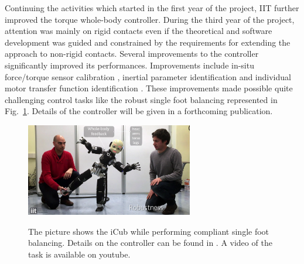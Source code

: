 
Continuing the activities which started in the first year of the project, IIT further improved the torque whole-body controller. During the third year of the project, attention was mainly on rigid contacts even if the theoretical and software development was guided and constrained by the requirements for extending the approach to non-rigid contacts. Several improvements to the controller significantly improved its performances. Improvements include in-situ force/torque sensor calibration \cite{Traversaro2015b}, inertial parameter identification \cite{Traversaro2015} and individual motor transfer function identification \cite{Nori2015a}. These improvements made possible quite challenging control tasks like the robust single foot balancing represented in Fig.~\ref{fig:footBalancing}. Details of the controller will be given in a forthcoming publication. 

\begin{figure}[h]
\vspace{0.5em}
\centering
{\includegraphics[width=0.65\textwidth]{images/single_foot_balancing.jpg}}
\caption{The picture shows the iCub while performing compliant single foot balancing. Details on the controller can be found in \cite{Nori2015a}. A video of the task is available on youtube\protect\footnotemark.}
\label{fig:footBalancing}
\end{figure}


